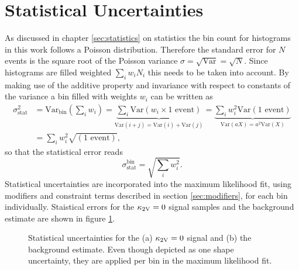 \section{Statistical Uncertainties}
As discussed in chapter \ref{sec:statistics} on statistics the bin count for histograms in this work follows a Poisson distribution. Therefore the standard error for $N$ events is the square root of the Poisson variance $\sigma=\sqrt{\text{Var}}=\sqrt{N}$. Since histograms are filled weighted $\sum_i w_i N_i$ this needs to be taken into account. By making use of the additive property and invariance with respect to constants of the variance a bin filled with weights $w_i$ can be written as
\begin{align}
    \sigma_\text{stat}^2 & = \text{Var}_\text{bin}\left(\sum_i w_i\right)
    =
    \underbrace{\sum_i \text{Var}(w_i \times 1\text{ event})}_{\text{Var}(i+j)=\text{Var}(i)+\text{Var}(j)}
    =
    \underbrace{\sum_i w_i^2\text{Var}(1\text{ event})}_{\text{Var}(aX)=a^2\text{Var}(X)} \\ \nonumber
                         & =\sum_i w_i^2\sqrt{(1\text{ event})},
\end{align}
so that the statistical error reads
\begin{equation}
    \sigma_\text{stat}^\text{bin}=\sqrt{\sum_i w_i^2}.
\end{equation}
Statistical uncertainties are incorporated into the maximum likelihood fit, using modifiers and constraint terms described in section \ref{sec:modifiers}, for each bin individually. Staistical errors for the $\kappa_{\text{2V}}=0$ signal samples and the background estimate are shown in figure \ref{fig:stat_unc}.

\begin{figure}
    \centering
    \caption[]{Statistical uncertainties for the (a) $\kappa_{\text{2V}}=0$ signal and (b) the background estimate. Even though depicted as one shape uncertainty, they are applied per bin in the maximum likelihood fit.}
    \label{fig:stat_unc}
\end{figure}


